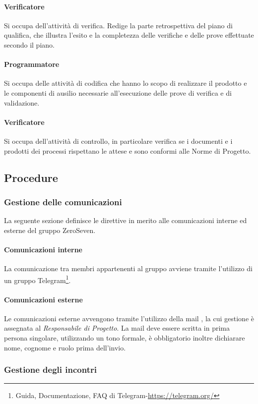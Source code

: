 \paragraph{Verificatore} Si occupa dell'attività di verifica. Redige la parte retrospettiva del piano di qualifica, che illustra l'esito e la completezza delle verifiche e delle prove effettuate secondo il piano. 
\paragraph{Programmatore} Si occupa delle attività di codifica che hanno lo scopo di realizzare il prodotto e le componenti di ausilio necessarie all'esecuzione delle prove di verifica e di validazione. 
\paragraph{Verificatore} Si occupa dell'attività di controllo, in particolare verifica se i documenti e i prodotti dei processi rispettano le attese e sono conformi alle Norme di Progetto.
\subsection{Procedure}
\subsubsection{Gestione delle comunicazioni}
La seguente sezione definisce le direttive in merito alle comunicazioni interne ed esterne del gruppo ZeroSeven.
\paragraph{Comunicazioni interne}
La comunicazione tra membri appartenenti al gruppo avviene tramite l'utilizzo di un gruppo Telegram\footnote{Guida, Documentazione, FAQ di Telegram-\url{https://telegram.org/}}.
\paragraph{Comunicazioni esterne}
Le comunicazioni esterne avvengono tramite l'utilizzo della mail \mailleaf, la cui gestione è assegnata al \textit{Responsabile di Progetto}.
La mail deve essere scritta in prima persona singolare, utilizzando un tono formale, è obbligatorio inoltre dichiarare nome, cognome e ruolo prima dell'invio.
\subsubsection{Gestione degli incontri}
